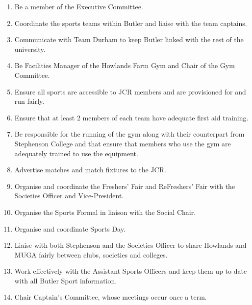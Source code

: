\begin{enumerate}
    \item Be a member of the Executive Committee.
    \item Coordinate the sports teams within Butler and liaise with the team captains.
    \item Communicate with Team Durham to keep Butler linked with the rest of the university.
    \item Be Facilities Manager of the Howlands Farm Gym and Chair of the Gym Committee.
    \item Ensure all sports are accessible to JCR members and are provisioned for and run fairly.
    \item Ensure that at least 2 members of each team have adequate first aid training.
    \item Be responsible for the running of the gym along with their counterpart from Stephenson College and that ensure that members who use the gym are adequately trained to use the equipment.
    \item Advertise matches and match fixtures to the JCR. 
    \item Organise and coordinate the Freshers' Fair and ReFreshers' Fair with the Societies Officer and Vice-President.
    \item Organise the Sports Formal in liaison with the Social Chair.
    \item Organise and coordinate Sports Day.
    \item Liaise with both Stephenson and the Societies Officer to share Howlands and MUGA fairly between clubs, societies and colleges.
    \item Work effectively with the Assistant Sports Officers and keep them up to date with all Butler Sport information.
    \item Chair Captain’s Committee, whose meetings occur once a term.
\end{enumerate}

